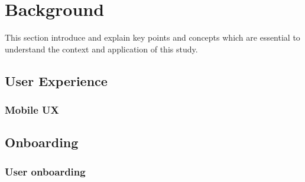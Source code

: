\chapter{Background}
\label{chap:background}
This section introduce and explain key points and concepts which are essential to understand the context and application of this study.

\section{User Experience}

\subsection{Mobile UX}

\section{Onboarding}

\subsection{User onboarding}
